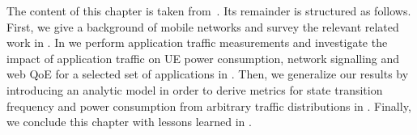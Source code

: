The content of this chapter is taken from~\cite{Schwartz2013a,Schwartz2013c}.
Its remainder is structured as follows.
First, we give a background of mobile networks and survey the relevant related work in .
In  we perform application traffic measurements and investigate the impact of application traffic on \gls{UE} power consumption, network signalling and web \gls{QoE} for a selected set of applications in .
Then, we generalize our results by introducing an analytic model in order to derive metrics for state transition frequency and power consumption from arbitrary traffic distributions in .
Finally, we conclude this chapter with lessons learned in .





